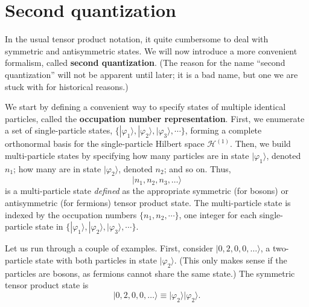\documentclass[pra,12pt]{revtex4}
\begin{document}
\section{Second quantization}

In the usual tensor product notation, it quite cumbersome to deal with
symmetric and antisymmetric states.  We will now introduce a more
convenient formalism, called \textbf{second quantization}.  (The
reason for the name ``second quantization'' will not be apparent until
later; it is a bad name, but one we are stuck with for historical
reasons.)

We start by defining a convenient way to specify states of multiple
identical particles, called the \textbf{occupation number
  representation}.  First, we enumerate a set of single-particle
states, $\{|\varphi_1\rangle, |\varphi_2\rangle, |\varphi_3\rangle,
\cdots\}$, forming a complete orthonormal basis for the
single-particle Hilbert space $\mathscr{H}^{(1)}$.  Then, we build
multi-particle states by specifying how many particles are in state
$|\varphi_1\rangle$, denoted $n_1$; how many are in state
$|\varphi_2\rangle$, denoted $n_2$; and so on.  Thus,
$$|n_1,n_2,n_3,\dots\rangle$$
is a multi-particle state \textit{defined} as the appropriate
symmetric (for bosons) or antisymmetric (for fermions) tensor product
state.  The multi-particle state is indexed by the occupation numbers
$\{n_1,n_2,\cdots\}$, one integer for each single-particle state in
$\{|\varphi_1\rangle, |\varphi_2\rangle, |\varphi_3\rangle, \cdots\}$.

Let us run through a couple of examples.  First, consider
$|0,2,0,0,\dots\rangle$, a two-particle state with both particles in
state $|\varphi_2\rangle$.  (This only makes sense if the particles
are bosons, as fermions cannot share the same state.)  The symmetric
tensor product state is
$$|0,2,0,0,\dots\rangle \equiv |\varphi_2\rangle|\varphi_2\rangle.$$
\end{document}
